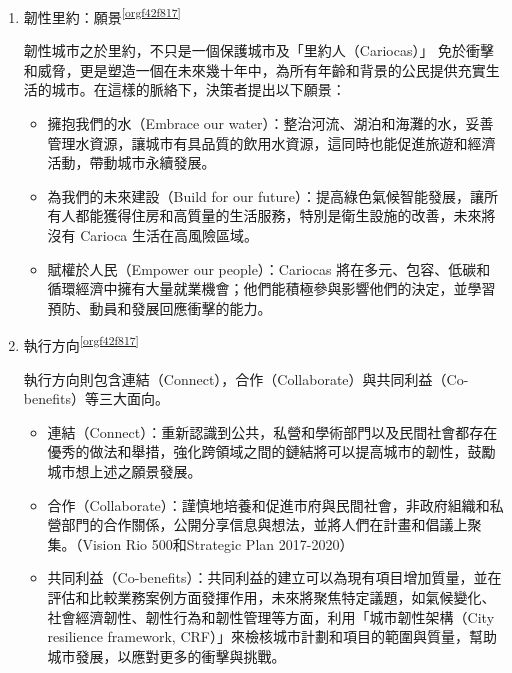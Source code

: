 \documentclass[a4paper,12pt]{article}
\begin{document}
\begin{enumerate}
\begin{enumerate}
\item 韌性里約：願景\textsuperscript{\ref{orgf42f817}}
\label{sec:org8f1d034}

韌性城市之於里約，不只是一個保護城市及「里約人（Cariocas）」 免於衝擊和威脅，更是塑造一個在未來幾十年中，為所有年齡和背景的公民提供充實生活的城市。在這樣的脈絡下，決策者提出以下願景：\\
\begin{itemize}
\item 擁抱我們的水（Embrace our water）：整治河流、湖泊和海灘的水，妥善管理水資源，讓城市有具品質的飲用水資源，這同時也能促進旅遊和經濟活動，帶動城市永續發展。\\
\item 為我們的未來建設（Build for our future）：提高綠色氣候智能發展，讓所有人都能獲得住房和高質量的生活服務，特別是衛生設施的改善，未來將沒有 Carioca 生活在高風險區域。\\
\item 賦權於人民（Empower our people）：Cariocas 將在多元、包容、低碳和循環經濟中擁有大量就業機會；他們能積極參與影響他們的決定，並學習預防、動員和發展回應衝擊的能力。\\
\end{itemize}

\item 執行方向\textsuperscript{\ref{orgf42f817}}
\label{sec:org2e3ad6f}

執行方向則包含連結（Connect），合作（Collaborate）與共同利益（Co-benefits）等三大面向。\\
\begin{itemize}
\item 連結（Connect）：重新認識到公共，私營和學術部門以及民間社會都存在優秀的做法和舉措，強化跨領域之間的鏈結將可以提高城市的韌性，鼓勵城市想上述之願景發展。\\
\item 合作（Collaborate）：謹慎地培養和促進市府與民間社會，非政府組織和私營部門的合作關係，公開分享信息與想法，並將人們在計畫和倡議上聚集。（Vision Rio 500和Strategic Plan 2017-2020）\\
\item 共同利益（Co-benefits）：共同利益的建立可以為現有項目增加質量，並在評估和比較業務案例方面發揮作用，未來將聚焦特定議題，如氣候變化、社會經濟韌性、韌性行為和韌性管理等方面，利用「城市韌性架構（City resilience framework, CRF）」來檢核城市計劃和項目的範圍與質量，幫助城市發展，以應對更多的衝擊與挑戰。\\
\end{itemize}


\end{enumerate}
\end{enumerate}
\end{document}
